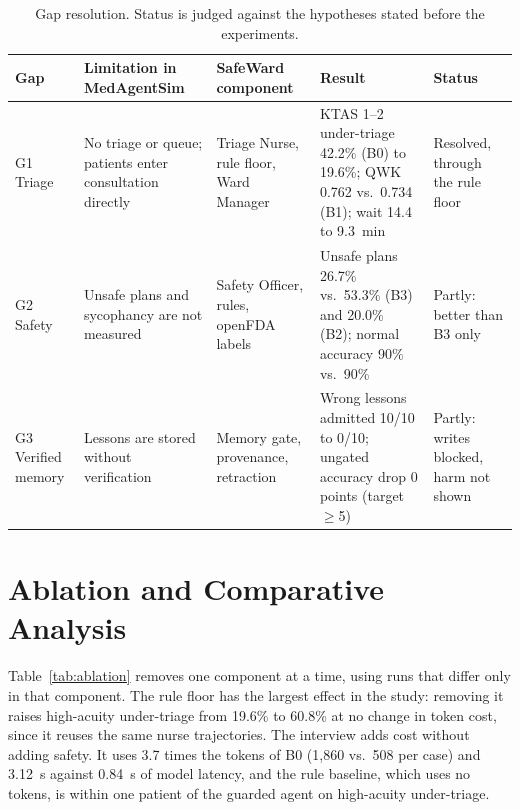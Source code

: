 \documentclass[conference]{IEEEtran}
\begin{document}
\begin{table}[t]
\caption{Gap resolution. Status is judged against the hypotheses stated before the experiments.}
\label{tab:gap}
\centering
\small
\begin{tabular}{p{2.1cm}p{3.6cm}p{3.4cm}p{4.8cm}p{1.7cm}}
\toprule
Gap & Limitation in MedAgentSim & SafeWard component & Result & Status \\
\midrule
G1 Triage & No triage or queue; patients enter consultation directly & Triage Nurse, rule floor, Ward Manager & KTAS 1--2 under-triage 42.2\% (B0) to 19.6\%; QWK 0.762 vs.\ 0.734 (B1); wait 14.4 to 9.3~min & Resolved, through the rule floor \\
G2 Safety & Unsafe plans and sycophancy are not measured & Safety Officer, rules, openFDA labels & Unsafe plans 26.7\% vs.\ 53.3\% (B3) and 20.0\% (B2); normal accuracy 90\% vs.\ 90\% & Partly: better than B3 only \\
G3 Verified memory & Lessons are stored without verification & Memory gate, provenance, retraction & Wrong lessons admitted 10/10 to 0/10; ungated accuracy drop 0 points (target $\geq$5) & Partly: writes blocked, harm not shown \\
\bottomrule
\end{tabular}
\end{table}

\section{Ablation and Comparative Analysis}

Table~\ref{tab:ablation} removes one component at a time, using runs that differ only in that
component. The rule floor has the largest effect in the study: removing it raises high-acuity
under-triage from 19.6\% to 60.8\% at no change in token cost, since it reuses the same nurse
trajectories. The interview adds cost without adding safety. It uses 3.7 times the tokens of B0
(1,860 vs.\ 508 per case) and 3.12~s against 0.84~s of model latency, and the rule baseline, which
uses no tokens, is within one patient of the guarded agent on high-acuity under-triage.
\end{document}
